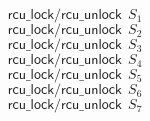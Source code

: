\documentclass{article}
\begin{document}
$$
\mathsf{rcu\_lock}/\mathsf{rcu\_unlock}\;\,S_1
$$
$$
\mathsf{rcu\_lock}/\mathsf{rcu\_unlock}\;\,S_2
$$
$$
\mathsf{rcu\_lock}/\mathsf{rcu\_unlock}\;\,S_3
$$
$$
\mathsf{rcu\_lock}/\mathsf{rcu\_unlock}\;\,S_4
$$
$$
\mathsf{rcu\_lock}/\mathsf{rcu\_unlock}\;\,S_5
$$
$$
\mathsf{rcu\_lock}/\mathsf{rcu\_unlock}\;\,S_6
$$
$$
\mathsf{rcu\_lock}/\mathsf{rcu\_unlock}\;\,S_7
$$
\end{document}

